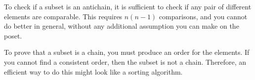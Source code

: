 
\begin{hint}
    To check if a subset is an antichain, it is sufficient to check if any pair of different elements are comparable.
    This requires $n(n-1)$ comparisons, and you cannot do better in general, without any additional assumption you can make on the poset.
\end{hint}

\begin{hint}
    To prove that a subset is a chain, you must produce an order for the elements.
    If you cannot find a consistent order, then the subset is not a chain.
    Therefore, an efficient way to do this might look like a sorting algorithm.
\end{hint}